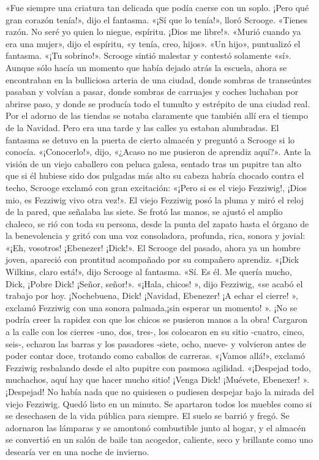 \documentclass{novela}
\begin{document}
 «Fue siempre una criatura tan delicada que podía caerse con un soplo. ¡Pero qué gran corazón tenía!», dijo el fantasma.
 «¡Sí que lo tenía!», lloró Scrooge. «Tienes razón. No seré yo quien lo niegue, espíritu. ¡Dios me libre!».
 «Murió cuando ya era una mujer», dijo el espíritu, «y tenía, creo, hijos».
 «Un hijo», puntualizó el fantasma. «¡Tu sobrino!».
 Scrooge sintió malestar y contestó solamente «sí».
 Aunque sólo hacía un momento que había dejado atrás la escuela, ahora se encontraban en la bulliciosa arteria de una ciudad, donde sombras de transeúntes pasaban y volvían a pasar, donde sombras de carruajes y coches luchaban por abrirse paso, y donde se producía todo el tumulto y estrépito de una ciudad real. Por el adorno de las tiendas se notaba claramente que también allí era el tiempo de la Navidad. Pero era una tarde y las calles ya estaban alumbradas.
 El fantasma se detuvo en la puerta de cierto almacén y preguntó a Scrooge si lo conocía.
 «¡Conocerlo!», dijo, «¿Acaso no me pusieron de aprendiz aquí?».
 Ante la visión de un viejo caballero con peluca galesa, sentado tras un pupitre tan alto que si él hubiese sido dos pulgadas más alto su cabeza habría chocado contra el techo, Scrooge exclamó con gran excitación:
 «¡Pero si es el viejo Fezziwig!, ¡Dios mio, es Fezziwig vivo otra vez!».
 El viejo Fezziwig posó la pluma y miró el reloj de la pared, que señalaba las siete. Se frotó las manos, se ajustó el amplio chaleco, se rió con toda su persona, desde la punta del zapato hasta el órgano de la benevolencia y gritó con una voz consoladora, profunda, rica, sonora y jovial:
 «¡Eh, vosotros! ¡Ebenezer! ¡Dick!».
 El Scrooge del pasado, ahora ya un hombre joven, apareció con prontitud acompañado por su compañero aprendiz.
 «¡Dick Wilkins, claro está!», dijo Scrooge al fantasma. «Sí. Es él. Me quería mucho, Dick, ¡Pobre Dick! ¡Señor, señor!». «¡Hala, chicos! », dijo Fezziwig, «se acabó el trabajo por hoy. ¡Nochebuena, Dick! ¡Navidad, Ebenezer! ¡A echar el cierre! », exclamó Fezziwig con una sonora palmada,¡sin esperar un momento! ».
 ¡No se podría creer la rapidez con que los chicos se pusieron manos a la obra! Cargaron a la calle con los cierres -uno, dos, tres-, los colocaron en su sitio -cuatro, cinco, seis-, echaron las barras y los pasadores -siete, ocho, nueve- y volvieron antes de poder contar doce, trotando como caballos de carreras.
 «¡Vamos allá!», exclamó Fezziwig resbalando desde el alto pupitre con pasmosa agilidad. «¡Despejad todo, muchachos, aquí hay que hacer mucho sitio! ¡Venga Dick! ¡Muévete, Ebenexer! ».
 ¡Despejad! No había nada que no quisiesen o pudiesen despejar bajo la mirada del viejo Fezziwig. Quedó listo en un minuto. Se apartaron todos los muebles como si se desechasen de la vida pública para siempre. El suelo se barrió y fregó. Se adornaron las lámparas y se amontonó combustible junto al hogar, y el almacén se convertió en un salón de baile tan acogedor, caliente, seco y brillante como uno desearía ver en una noche de invierno.
\end{document}
